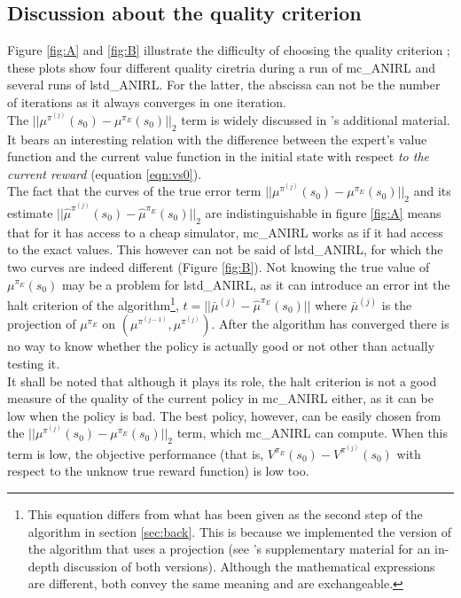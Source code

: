 \documentclass{jfpda2011}
\begin{document}
\subsection{Discussion about the quality criterion}
\label{ssec:quality}
Figure \ref{fig:A} and \ref{fig:B} illustrate the difficulty of choosing the quality criterion ; these plots show four different quality ciretria during a run of mc\_ANIRL and several runs of lstd\_ANIRL. For the latter, the abscissa can not be the number of iterations as it always converges in one iteration.\\

The $||\mu^{\pi^{(j)}}(s_0) - \mu^{\pi_E}(s_0)||_2$ term is widely discussed in \citep{abbeel2004apprenticeship}'s additional material. It bears an interesting relation with the difference between the expert's value function and the current value function in the initial state with respect \emph{to the current reward} (equation \ref{eqn:vs0}).\\

The fact that  the curves of the true error term $||\mu^{\pi^{(j)}}(s_0) - \mu^{\pi_E}(s_0)||_2$ and  its estimate $||\hat\mu^{\pi^{(j)}}(s_0) - \hat\mu^{\pi_E}(s_0)||_2$ are indistinguishable in figure \ref{fig:A} means that for it has access to a cheap simulator, mc\_ANIRL works as if it had access to the exact values. This however can not be said of lstd\_ANIRL, for which the two curves are indeed different (Figure \ref{fig:B}). Not knowing the true value of $\mu^{\pi_E}(s_0)$ may be a problem for lstd\_ANIRL, as it can introduce an error int the halt criterion of the algorithm\footnote{This equation differs from what has been given as the second step of the algorithm in section \ref{sec:back}. This is because we implemented the version of the algorithm that uses a projection (see \citet{abbeel2004apprenticeship}'s supplementary material for an in-depth discussion of both versions). Although the mathematical expressions are different, both convey the same meaning and are exchangeable.}, $t = ||\bar\mu^{(j)}-\hat\mu^{\pi_E}(s_0)||$ where $\bar\mu^{(j)}$ is the projection of $\mu^{\pi_E}$ on $(\mu^{\pi^{(j-1)}},\mu^{\pi^{(j)}})$. After the algorithm has converged there is no way to know whether the policy is actually good or not other than actually testing it.\\

It shall be noted that although it plays its role, the halt criterion is not a good measure of the quality of the current policy in mc\_ANIRL either, as it can be low when the policy is bad. The best policy, however, can be easily chosen from the $||\mu^{\pi^{(j)}}(s_0) - \mu^{\pi_E}(s_0)||_2$ term, which mc\_ANIRL can compute. When this term is low, the objective performance (that is, $V^{\pi_E}(s_0)-V^{\pi^{(j)}}(s_0)$ with respect to the unknow true reward function) is low too. 
\end{document}
